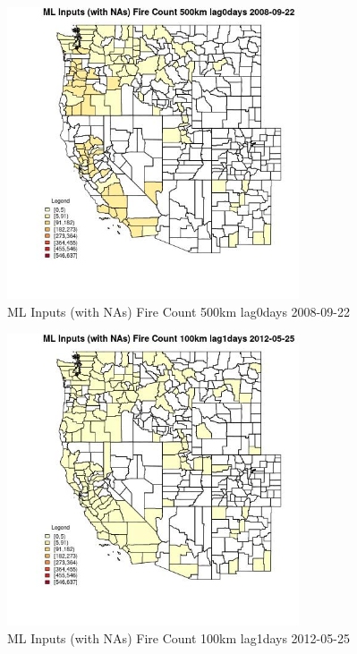 \begin{figure} 
\centering  
\includegraphics[width=0.77\textwidth]{Code_Outputs/Report_ML_input_PM25_Step4_part_e_de_duplicated_aves_compiled_2019-05-18wNAs_CountyFire_Count_500km_lag0daysMean2008-09-22.jpg} 
\caption{\label{fig:Report_ML_input_PM25_Step4_part_e_de_duplicated_aves_compiled_2019-05-18wNAsCountyFire_Count_500km_lag0daysMean2008-09-22}ML Inputs (with NAs) Fire Count 500km lag0days 2008-09-22} 
\end{figure} 
 

\begin{figure} 
\centering  
\includegraphics[width=0.77\textwidth]{Code_Outputs/Report_ML_input_PM25_Step4_part_e_de_duplicated_aves_compiled_2019-05-18wNAs_CountyFire_Count_100km_lag1daysMean2012-05-25.jpg} 
\caption{\label{fig:Report_ML_input_PM25_Step4_part_e_de_duplicated_aves_compiled_2019-05-18wNAsCountyFire_Count_100km_lag1daysMean2012-05-25}ML Inputs (with NAs) Fire Count 100km lag1days 2012-05-25} 
\end{figure} 
 

